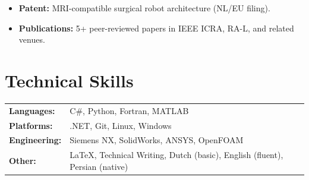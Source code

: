 \documentclass[10pt,a4paper]{article}
\begin{document}
\begin{itemize}
 \item \textbf{Patent:} MRI-compatible surgical robot architecture (NL/EU filing).
 \item \textbf{Publications:} 5+ peer-reviewed papers in IEEE ICRA, RA-L, and related venues.
\end{itemize}

\section{Technical Skills}

\begin{tabularx}{\textwidth}{@{}lX@{}}
 \textbf{Languages:} & C\#, Python, Fortran, MATLAB \\
 \textbf{Platforms:}  & .NET, Git, Linux, Windows \\
 \textbf{Engineering:} & Siemens NX, SolidWorks, ANSYS, OpenFOAM \\
 \textbf{Other:}    & \LaTeX, Technical Writing, Dutch (basic), English (fluent), Persian (native) \\
\end{tabularx}
\end{document}

